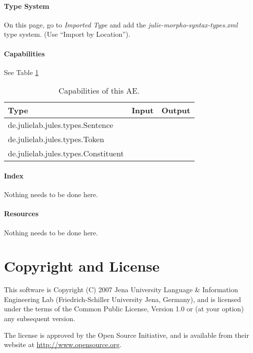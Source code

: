 \documentclass[11pt,a4paper,halfparskip]{scrartcl}
\begin{document}
\paragraph{Type System}
\label{sss:type_system}
On this page, go to \emph{Imported Type} and add the \emph{julie-morpho-syntax-types.xml} type
system. (Use ``Import by Location'').

\paragraph{Capabilities}
See Table \ref{tab:capabilities}

\begin{table}[h!]
  \centering
  \begin{tabular}{|p{6cm}|p{2cm}|p{2cm}|}
    \hline
    Type & Input & Output \\
    \hline\hline
    	de.julielab.jules.types.Sentence & \checked & \\
	de.julielab.jules.types.Token & \checked & \\
	de.julielab.jules.types.Constituent & & \checked\\
  \hline
  \end{tabular}
  \caption{Capabilities of this AE.}
  \label{tab:capabilities}
\end{table}


\paragraph{Index}
Nothing needs to be done here.

\paragraph{Resources}
Nothing needs to be done here.


\section{Copyright and License}
This software is Copyright (C) 2007 Jena University Language \& Information
Engineering Lab (Friedrich-Schiller University Jena, Germany), and is
licensed under the terms of the Common Public License, Version 1.0 or (at
your option) any subsequent version.

The license is approved by the Open Source Initiative, and is
available from their website at \url{http://www.opensource.org}.



\end{document}

